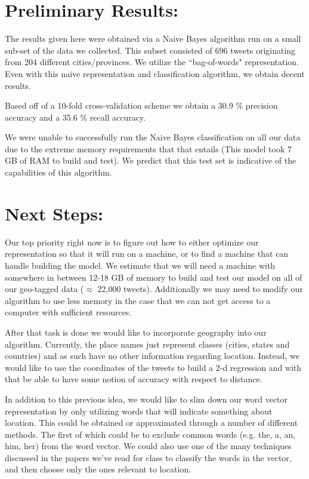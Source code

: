 \documentclass[12pt]{article}
\begin{document}
\section*{Preliminary Results:}
The results given here were obtained via a Naive Bayes algorithm run on a small sub-set of the data we collected. This subset consisted of 696 tweets originating from 204 different cities/provinces. We utilize the ``bag-of-words" representation. Even with this naive representation and classification algorithm, we obtain decent results. 

Based off of a 10-fold cross-validation scheme we obtain a 30.9 \% precision accuracy and a 35.6 \% recall accuracy. 

We were unable to successfully run the Naive Bayes classification on all our data due to the extreme memory requirements that that entails (This model took 7 GB of RAM to build and test). We predict that this test set is indicative of the capabilities of this algorithm. 

\section*{Next Steps:}
Our top priority right now is to figure out how to either optimize our representation so that it will run on a machine, or to find a machine that can handle building the model. We estimate that we will need a machine with somewhere in between 12-18 GB of memory to build and test our model on all of our geo-tagged data ($\approx$ 22,000 tweets). Additionally we may need to modify our algorithm to use less memory in the case that we can not get access to a computer with sufficient resources.

After that task is done we would like to incorporate geography into our algorithm. Currently, the place names just represent classes (cities, states and countries) and as such have no other information regarding location. Instead, we would like to use the coordinates of the tweets to build a 2-d regression and with that be able to have some notion of accuracy with respect to distance.   

In addition to this previous idea, we would like to slim down our word vector representation by only utilizing words that will indicate something about location. This could be obtained or approximated through a number of different methods. The first of which could be to exclude common words (e.g. the, a, an, him, her) from the word vector. We could also use one of the many techniques discussed in the papers we've read for class to classify the words in the vector, and then choose only the ones relevant to location. 
\end{document}
